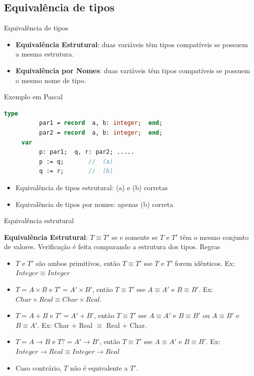 \documentclass[handout]{beamer}
\begin{document}
\subsection{Equivalência de tipos}

\begin{frame}[fragile]{Equivalência de tipos}
   \begin{itemize}
   \item \textbf{Equivalência Estrutural}: duas variáveis têm tipos compatíveis se possuem a mesma estrutura.
   \item \textbf{Equivalência por Nomes}: duas variáveis têm tipos compatíveis se possuem o mesmo nome de tipo.
	\end{itemize}
\begin{block}{Exemplo em Pascal}\vspace{-1mm}
	\begin{lstlisting}[language=Pascal,numbers=none]
     type
          par1 = record  a, b: integer;  end;
          par2 = record  a, b: integer;  end;
     var
          p: par1;  q, r: par2; .....
          p := q;      	//  (a)
          q := r;      	//  (b)
  \end{lstlisting}
\end{block}

	 \begin{itemize}
   \item Equivalência de tipos estrutural: (a) e (b) corretas
   \item Equivalência de tipos por nomes: apenas (b) correta
   \end{itemize}
\end{frame}

\begin{frame}{Equivalência estrutural}

\textbf{Equivalência Estrutural}:  $T \equiv T'$  se e somente se $T$ e $T'$  têm o mesmo conjunto de valores. Verificação é feita comparando a estrutura dos tipos. Regras

\begin{itemize}
\item $T$  e $T'$  são ambos primitivos, então $T \equiv T'$  sse $T$ e $T'$  forem idênticos.   Ex:    $Integer \equiv Integer$

\item $T = A \times B$  e  $T' = A' \times B'$, então $T \equiv T'$ sse $A \equiv A'$ e  $B \equiv B'$.   Ex: $Char \times Real   \equiv   Char \times Real$.

\item $T = A + B$  e $T' = A' + B'$, então $T \equiv T'$ sse $A \equiv A'$ e    $B \equiv B'$      ou      $A \equiv B'$   e   $B \equiv A'$.
	Ex:  Char + Real   $\equiv$   Real + Char.

\item $T = A \rightarrow B$ e $T? = A' \rightarrow B'$, então $T \equiv T'$ sse $A \equiv A'$ e $B \equiv B'$.  Ex: $Integer \rightarrow Real  \equiv   Integer \rightarrow Real$

\item Caso contrário, $T$ não é equivalente a $T'$.

\end{itemize}
\end{frame}
\end{document}
